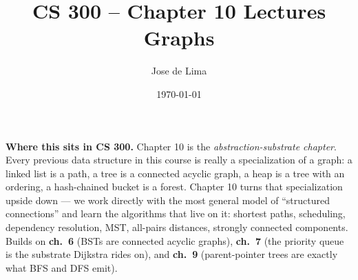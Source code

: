 \documentclass[11pt]{article}
\title{CS 300 -- Chapter 10 Lectures\\\large Graphs}
\author{Jose de Lima}
\date{\today}
\begin{document}
\maketitle

\begin{ideabox}
\textbf{Where this sits in CS 300.} Chapter 10 is the
\emph{abstraction-substrate chapter}. Every previous data structure in
this course is really a specialization of a graph: a linked list is a
path, a tree is a connected acyclic graph, a heap is a tree with an
ordering, a hash-chained bucket is a forest. Chapter 10 turns that
specialization upside down --- we work directly with the most general
model of ``structured connections'' and learn the algorithms that live
on it: shortest paths, scheduling, dependency resolution, MST,
all-pairs distances, strongly connected components. Builds on
\textbf{ch.~6} (BSTs are connected acyclic graphs), \textbf{ch.~7}
(the priority queue is the substrate Dijkstra rides on), and
\textbf{ch.~9} (parent-pointer trees are exactly what BFS and DFS
emit).


\end{ideabox}
\end{document}
